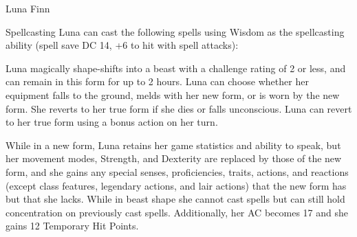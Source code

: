 \begin{DndMonster}[width=\textwidth + 8pt]{Luna Finn}
\begin{multicols}{2}
		\DndMonsterAttack[
			name			= Quartestaff,
			distance		= melee,	%
			mod				= +1,
			reach			= 5,
			targets			= one target,
			dmg				= \DndDice{1d6 - 1},
			dmg-type		= Piercing,
			or-dmg			= \DndDice{1d8 - 1},
			or-dmg-when		= {if used with two hands},
		]
		
		\DndMonsterAttack[
			name			= Sickle,
			distance		= melee,	%
			mod				= +1,
			reach			= 5,
			targets			= one target,
			dmg				= \DndDice{1d4 - 1},
			dmg-type		= Slashing,
			extra			= {. As a Bonus Action, Luna can make another attack against the same target. On a hit the target takes \DndDice{1d4} Slashing damage},
		]
		
		\begin{DndMonsterSpells}
			\item[Spellcasting] Luna can cast the following spells using Wisdom as the spellcasting ability (spell save DC 14, +6 to hit with spell attacks):
		\end{DndMonsterSpells}
		
		Luna magically shape-shifts into a beast with a challenge rating of 2 or less, and can remain in this form for up to 2 hours. Luna can choose whether her equipment falls to the ground, melds with her new form, or is worn by the new form. She reverts to her true form if she dies or falls unconscious. Luna can revert to her true form using a bonus action on her turn.
	
		While in a new form, Luna retains her game statistics and ability to speak, but her movement modes, Strength, and Dexterity are replaced by those of the new form, and she gains any special senses, proficiencies, traits, actions, and reactions (except class features, legendary actions, and lair actions) that the new form has but that she lacks. While in beast shape she cannot cast spells but can still hold concentration on previously cast spells. Additionally, her AC becomes 17 and she gains 12 Temporary Hit Points.
	

\end{multicols}
\end{DndMonster}
